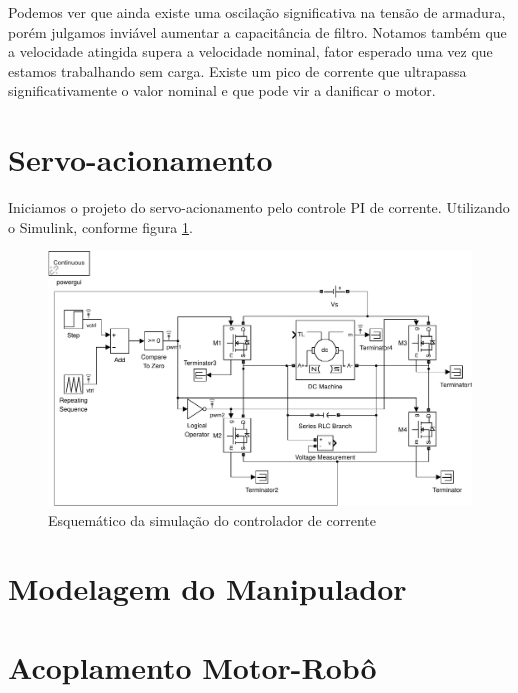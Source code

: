 \documentclass{article}
\begin{document}
Podemos ver que ainda existe uma oscilação significativa na tensão de armadura, porém julgamos inviável aumentar a capacitância de filtro. Notamos também que a velocidade atingida supera a velocidade nominal, fator esperado uma vez que estamos trabalhando sem carga. Existe um pico de corrente que ultrapassa significativamente o valor nominal e que pode vir a danificar o motor.

\section{Servo-acionamento}
Iniciamos o projeto do servo-acionamento pelo controle PI de corrente. Utilizando o Simulink, conforme figura \ref{fig:sim2}.

\begin{figure}[H]
	\centering
	\includegraphics[width=\linewidth]{matlab/sim1}
	\caption{Esquemático da simulação do controlador de corrente}
	\label{fig:sim2}
\end{figure}

\section{Modelagem do Manipulador}
\section{Acoplamento Motor-Robô}



\end{document}
